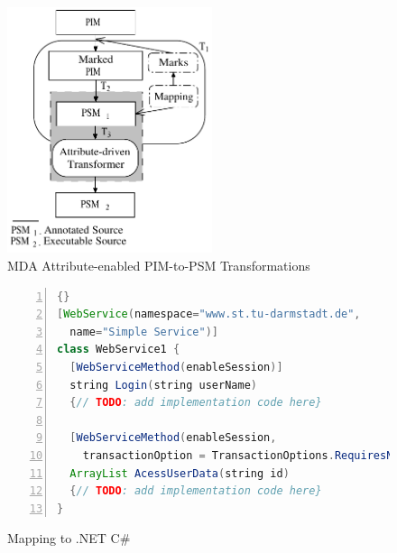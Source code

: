 \begin{figure}[ht]
	\begin{center}
		\includegraphics[width=6cm,height=!]{ch03/mda-model2}
	\end{center}
	\caption{MDA Attribute-enabled PIM-to-PSM Transformations}
	\label{fig.gaast-mda-model}
\end{figure}


\begin{figure}[ht]
	\begin{center}
	\begin{minipage}[t]{8cm}
	\begin{scriptsize}
\begin{lstlisting}[numbers=left,language=Java,frame=leftline,showstringspaces=false]{}
[WebService(namespace="www.st.tu-darmstadt.de",
  name="Simple Service")]
class WebService1 {
  [WebServiceMethod(enableSession)]
  string Login(string userName)
  {// TODO: add implementation code here}

  [WebServiceMethod(enableSession,
    transactionOption = TransactionOptions.RequiresNew)]
  ArrayList AcessUserData(string id)
  {// TODO: add implementation code here}
}
\end{lstlisting}
\end{scriptsize}
\end{minipage}	
	\end{center}
	\caption{Mapping to .NET C\#}
	\label{fig.text.2}
\end{figure}

